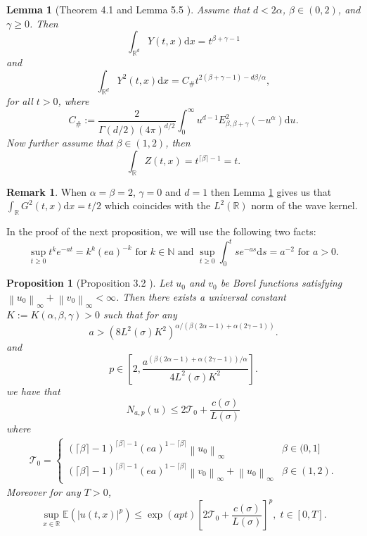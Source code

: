 \documentclass[a4paper,11pt]{article}
\numberwithin{equation}{section}
\theoremstyle{plain}
\newtheorem{lemma}[theorem]{Lemma}
\newtheorem{proposition}[theorem]{Proposition}
\theoremstyle{definition}
\newtheorem{remark}[theorem]{Remark}
\newcommand{\ud}{\ensuremath{\mathrm{d} }}
\newcommand{\Norm}[1]{\left\|  #1   \right\|}
\newcommand{\R}{\mathbb{R}}
\numberwithin{NQ}{section}
\numberwithin{LQ}{section}
\numberwithin{ZQ}{section}
\begin{document}
	\begin{lemma}[Theorem 4.1 and Lemma 5.5 \cite{CHN19}]
	\label{L:1and2normYZ}
Assume that $d < 2\alpha$, $\beta \in (0,2)$, and $\gamma \ge 0$. Then 
	\[
		\int_{\R^d} Y(t,x) \ud x = t^{\beta+\gamma -1 }
	\]
and
	\[
		\int_{\R^d} Y^2(t,x) \ud x = C_{\#} t^{2(\beta+\gamma-1)-d\beta/\alpha},
	\]
for all $t > 0$, where 
	\[
		C_{\#} := \frac{2}{\Gamma(d/2)(4 \pi )^{d/2}} \int_0^\infty u^{d-1}E^2_{\beta,\beta + \gamma}(-u^\alpha) \ud u.
	\]
Now further assume that $\beta \in (1,2)$, then 
	\[
		\int_{\R} Z(t,x) = t^{\lceil \beta \rceil -1} = t. 
	\]
	\end{lemma}
	\begin{remark}
When $\alpha = \beta = 2$,  $\gamma = 0$ and $d=1$ then Lemma \ref{L:1and2normYZ} gives us that $\int_{\R} G^2(t,x) \ud x = t/2$ which coincides with the $L^2(\R)$ norm of the wave kernel. 
	\end{remark}
In the proof of the next proposition, we will use the following two facts:
	\begin{equation}
	\label{E:SUPidentities}
		\sup_{t\ge0} t^ke^{-at} = k^k(ea)^{-k} \text{ for }k \in \mathbb{N} \text{ and } \sup_{t \ge 0} \int_0^t s e^{-as} \ud s = a^{-2} \text{ for } a>0.
	\end{equation}
	\begin{proposition}[Proposition 3.2 \cite{SoleMillet2021}] 
Let $u_0$ and $v_0$ be Borel functions satisfying $\Norm{u_0}_\infty + \Norm{v_0}_\infty < \infty$. Then there exists a universal constant $K:=K(\alpha, \beta, \gamma) >0$ such that for any 
	\[
		a > \left( 8 L^2(\sigma)K^2\right)^{\alpha/(\beta(2\alpha-1)+\alpha(2\gamma -1))}.
	\]
and 
	\[
		p \in \left[ 2, \frac{a^{(\beta(2\alpha-1)+\alpha(2\gamma-1))/\alpha}}{4L^2(\sigma)K^2} \right].
	\]
we have that 
	\begin{equation}
	\label{E:Nbdd}
		N_{a,p}(u)  \le 2 \mathcal{T}_0 +  \frac{c(\sigma)}{L(\sigma)}
	\end{equation}	
where
	\begin{align*}
		\mathcal{T}_0 = \begin{cases} 
		(\lceil \beta \rceil - 1)^{\lceil \beta \rceil -1}(ea)^{1-\lceil \beta \rceil} \Norm{u_0}_\infty  & \beta \in (0,1]
		\\ (\lceil \beta \rceil - 1)^{\lceil \beta \rceil -1}(ea)^{1-\lceil \beta \rceil} \Norm{v_0}_\infty + \Norm{u_0}_\infty & \beta \in (1,2).
		\end{cases} 
	\end{align*}
Moreover for any $T>0$,
	\begin{equation}
	\label{E:Pnormtbdd}
		\sup_{x\in\R} \mathbb{E}(|u(t,x)|^p) \le \exp\left( a p t  \right) \left[ 2 \mathcal{T}_0 + \frac{ c(\sigma) }{L(\sigma)} \right]^p, \; t\in[0,T].
	\end{equation}
	\end{proposition}
\end{document}

